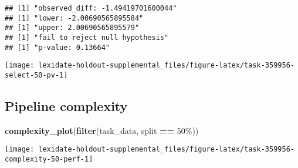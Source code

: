 \documentclass[
]{book}
\newenvironment{Shaded}{\begin{snugshade}}{\end{snugshade}}
\newcommand{\AttributeTok}[1]{\textcolor[rgb]{0.13,0.29,0.53}{#1}}
\newcommand{\DecValTok}[1]{\textcolor[rgb]{0.00,0.00,0.81}{#1}}
\newcommand{\FunctionTok}[1]{\textcolor[rgb]{0.13,0.29,0.53}{\textbf{#1}}}
\newcommand{\NormalTok}[1]{#1}
\newcommand{\OtherTok}[1]{\textcolor[rgb]{0.56,0.35,0.01}{#1}}
\newcommand{\SpecialCharTok}[1]{\textcolor[rgb]{0.81,0.36,0.00}{\textbf{#1}}}
\newcommand{\StringTok}[1]{\textcolor[rgb]{0.31,0.60,0.02}{#1}}
\begin{document}
\begin{Shaded}
\end{Shaded}

\begin{verbatim}
## [1] "observed_diff: -1.49419701600044"
## [1] "lower: -2.00690565895584"
## [1] "upper: 2.00690565895579"
## [1] "fail to reject null hypothesis"
## [1] "p-value: 0.13664"
\end{verbatim}

\texttt{[image: lexidate-holdout-supplemental\_files/figure-latex/task-359956-select-50-pv-1]}

\hypertarget{pipeline-complexity-26}{%
\subsection{Pipeline complexity}\label{pipeline-complexity-26}}

\begin{Shaded}
\begin{Highlighting}[]
\FunctionTok{complexity\_plot}\NormalTok{(}\FunctionTok{filter}\NormalTok{(task\_data, split }\SpecialCharTok{==} \StringTok{\textquotesingle{}50\%\textquotesingle{}}\NormalTok{))}
\end{Highlighting}
\end{Shaded}

\texttt{[image: lexidate-holdout-supplemental\_files/figure-latex/task-359956-complexity-50-perf-1]}
\end{document}
